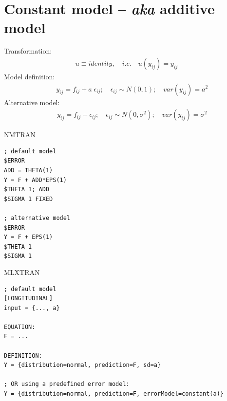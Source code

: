 %

\section{Constant model -- \emph{aka} additive model}
\label{model1}

Transformation:
\begin{eqnarray}
u \equiv identity, \quad i.e. \quad u(y_{ij}) = y_{ij} \nonumber
\end{eqnarray}
Model definition:
\begin{eqnarray}
&& y_{ij} = f_{ij} + a \; \epsilon_{ij}; \quad \epsilon_{ij} \sim N(0,1); \quad \mathit{var}(y_{ij}) = a^2 \nonumber
\end{eqnarray}
Alternative model:
\begin{eqnarray}
&& y_{ij} = f_{ij} + \epsilon_{ij}; \quad \epsilon_{ij} \sim N(0,\sigma^2); \quad \mathit{var}(y_{ij}) = \sigma^2 \nonumber
\end{eqnarray}

\begin{lrbox}{\lstbox}\begin{minipage}{16cm}
NMTRAN
\begin{lstlisting}[frame=single,language=NM]
; default model
$ERROR
ADD = THETA(1)
Y = F + ADD*EPS(1)
$THETA 1; ADD
$SIGMA 1 FIXED

; alternative model
$ERROR
Y = F + EPS(1)
$THETA 1
$SIGMA 1
\end{lstlisting}   
\end{minipage}\end{lrbox}
\usebox\lstbox


\begin{lrbox}{\lstbox}\begin{minipage}{16cm}
MLXTRAN
\begin{lstlisting}[frame=single,language=MLX]
; default model
[LONGITUDINAL]
input = {..., a}

EQUATION:
F = ...

DEFINITION:
Y = {distribution=normal, prediction=F, sd=a}

; OR using a predefined error model:
Y = {distribution=normal, prediction=F, errorModel=constant(a)}
\end{lstlisting}   
\end{minipage}\end{lrbox}
\usebox\lstbox

